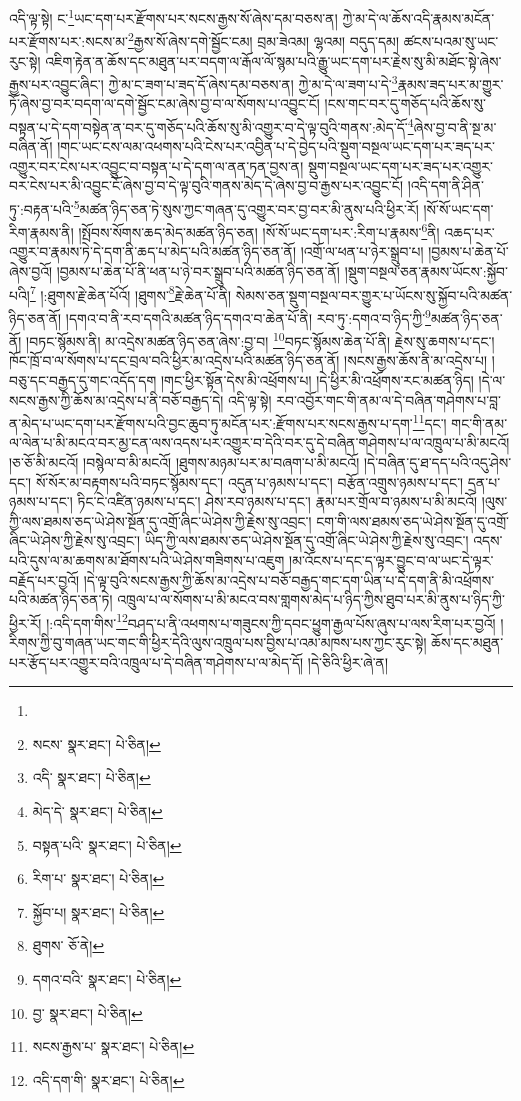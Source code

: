 འདི་ལྟ་སྟེ། ང་\footnote{}ཡང་དག་པར་རྫོགས་པར་སངས་རྒྱས་སོ་ཞེས་དམ་བཅས་ན། ཀྱེ་མ་དེ་ལ་ཆོས་འདི་རྣམས་མངོན་པར་རྫོགས་པར་:སངས་མ་\footnote{སངས་  སྣར་ཐང་།  པེ་ཅིན། }རྒྱས་སོ་ཞེས་དགེ་སྦྱོང་ངམ། བྲམ་ཟེའམ། ལྷའམ། བདུད་དམ། ཚངས་པའམ་སུ་ཡང་རུང་སྟེ། འཇིག་རྟེན་ན་ཆོས་དང་མཐུན་པར་བདག་ལ་རྒོལ་ལོ་སྙམ་པའི་རྒྱུ་ཡང་དག་པར་རྗེས་སུ་མི་མཐོང་སྟེ་ཞེས་རྒྱས་པར་འབྱུང་ཞིང་། ཀྱེ་མ་ང་ཟག་པ་ཟད་དོ་ཞེས་དམ་བཅས་ན། ཀྱེ་མ་དེ་ལ་ཟག་པ་དེ་\footnote{འདི་  སྣར་ཐང་།  པེ་ཅིན། }རྣམས་ཟད་པར་མ་གྱུར་ཏོ་ཞེས་བྱ་བར་བདག་ལ་དགེ་སྦྱོང་ངམ་ཞེས་བྱ་བ་ལ་སོགས་པ་འབྱུང་ངོ། །ངས་གང་བར་དུ་གཅོད་པའི་ཆོས་སུ་བསྟན་པ་དེ་དག་བསྟེན་ན་བར་དུ་གཅོད་པའི་ཆོས་སུ་མི་འགྱུར་བ་དེ་ལྟ་བུའི་གནས་:མེད་དོ་\footnote{མེད་དེ་  སྣར་ཐང་།  པེ་ཅིན། }ཞེས་བྱ་བ་ནི་སྔ་མ་བཞིན་ནོ། །གང་ཡང་ངས་ལམ་འཕགས་པའི་ངེས་པར་འབྱིན་པ་དེ་བྱེད་པའི་སྡུག་བསྔལ་ཡང་དག་པར་ཟད་པར་འགྱུར་བར་ངེས་པར་འབྱུང་བ་བསྟན་པ་དེ་དག་ལ་ནན་ཏན་བྱས་ན། སྡུག་བསྔལ་ཡང་དག་པར་ཟད་པར་འགྱུར་བར་ངེས་པར་མི་འབྱུང་ངོ་ཞེས་བྱ་བ་དེ་ལྟ་བུའི་གནས་མེད་དེ་ཞེས་བྱ་བ་རྒྱས་པར་འབྱུང་ངོ། །འདི་དག་ནི་ཤིན་ཏུ་:བརྟན་པའི་\footnote{བསྟན་པའི་  སྣར་ཐང་།  པེ་ཅིན། }མཚན་ཉིད་ཅན་ཏེ་སུས་ཀྱང་གཞན་དུ་འགྱུར་བར་བྱ་བར་མི་ནུས་པའི་ཕྱིར་རོ། །སོ་སོ་ཡང་དག་རིག་རྣམས་ནི། །སྤོབས་སོགས་ཆད་མེད་མཚན་ཉིད་ཅན། །སོ་སོ་ཡང་དག་པར་:རིག་པ་རྣམས་\footnote{རིག་པ་  སྣར་ཐང་།  པེ་ཅིན། }ནི། འཆད་པར་འགྱུར་བ་རྣམས་ཏེ་དེ་དག་ནི་ཆད་པ་མེད་པའི་མཚན་ཉིད་ཅན་ནོ། །འགྲོ་ལ་ཕན་པ་ཉེར་སྒྲུབ་པ། །བྱམས་པ་ཆེན་པོ་ཞེས་བྱའོ། །བྱམས་པ་ཆེན་པོ་ནི་ཕན་པ་ཉེ་བར་སྒྲུབ་པའི་མཚན་ཉིད་ཅན་ནོ། །སྡུག་བསྔལ་ཅན་རྣམས་ཡོངས་:སྐྱོབ་པའི།\footnote{སྐྱོབ་པ།  སྣར་ཐང་།  པེ་ཅིན། } །:ཐུགས་རྗེ་ཆེན་པོའོ། །ཐུགས་\footnote{ཐུགས་  ཅོ་ནེ། }རྗེ་ཆེན་པོ་ནི། སེམས་ཅན་སྡུག་བསྔལ་བར་གྱུར་པ་ཡོངས་སུ་སྐྱོབ་པའི་མཚན་ཉིད་ཅན་ནོ། །དགའ་བ་ནི་རབ་དགའི་མཚན་ཉིད་དགའ་བ་ཆེན་པོ་ནི། རབ་ཏུ་:དགའ་བ་ཉིད་ཀྱི་\footnote{དགའ་བའི་  སྣར་ཐང་།  པེ་ཅིན། }མཚན་ཉིད་ཅན་ནོ། །བཏང་སྙོམས་ནི། མ་འདྲེས་མཚན་ཉིད་ཅན་ཞེས་:བྱ་བ། \footnote{བྱ་  སྣར་ཐང་།  པེ་ཅིན། }བཏང་སྙོམས་ཆེན་པོ་ནི། རྗེས་སུ་ཆགས་པ་དང་། ཁོང་ཁྲོ་བ་ལ་སོགས་པ་དང་བྲལ་བའི་ཕྱིར་མ་འདྲེས་པའི་མཚན་ཉིད་ཅན་ནོ། །སངས་རྒྱས་ཆོས་ནི་མ་འདྲེས་པ། །བཅུ་དང་བརྒྱད་དུ་གང་འདོད་དག །གང་ཕྱིར་སྟོན་དེས་མི་འཕྲོགས་པ། །དེ་ཕྱིར་མི་འཕྲོགས་རང་མཚན་ཉིད། །དེ་ལ་སངས་རྒྱས་ཀྱི་ཆོས་མ་འདྲེས་པ་ནི་བཅོ་བརྒྱད་དེ། འདི་ལྟ་སྟེ། རབ་འབྱོར་གང་གི་ནམ་ལ་དེ་བཞིན་གཤེགས་པ་བླ་ན་མེད་པ་ཡང་དག་པར་རྫོགས་པའི་བྱང་ཆུབ་ཏུ་མངོན་པར་:རྫོགས་པར་སངས་རྒྱས་པ་དག་\footnote{སངས་རྒྱས་པ་  སྣར་ཐང་།  པེ་ཅིན། }དང་། གང་གི་ནམ་ལ་ལེན་པ་མི་མངའ་བར་མྱ་ངན་ལས་འདས་པར་འགྱུར་བ་དེའི་བར་དུ་དེ་བཞིན་གཤེགས་པ་ལ་འཁྲུལ་པ་མི་མངའོ། །ཅ་ཅོ་མི་མངའོ། །བསྙེལ་བ་མི་མངའོ། །ཐུགས་མཉམ་པར་མ་བཞག་པ་མི་མངའོ། །དེ་བཞིན་དུ་ཐ་དད་པའི་འདུ་ཤེས་དང་། སོ་སོར་མ་བརྟགས་པའི་བཏང་སྙོམས་དང་། འདུན་པ་ཉམས་པ་དང་། བརྩོན་འགྲུས་ཉམས་པ་དང་། དྲན་པ་ཉམས་པ་དང་། ཏིང་ངེ་འཛིན་ཉམས་པ་དང་། ཤེས་རབ་ཉམས་པ་དང་། རྣམ་པར་གྲོལ་བ་ཉམས་པ་མི་མངའོ། །ལུས་ཀྱི་ལས་ཐམས་ཅད་ཡེ་ཤེས་སྔོན་དུ་འགྲོ་ཞིང་ཡེ་ཤེས་ཀྱི་རྗེས་སུ་འབྲང་། ངག་གི་ལས་ཐམས་ཅད་ཡེ་ཤེས་སྔོན་དུ་འགྲོ་ཞིང་ཡེ་ཤེས་ཀྱི་རྗེས་སུ་འབྲང་། ཡིད་ཀྱི་ལས་ཐམས་ཅད་ཡེ་ཤེས་སྔོན་དུ་འགྲོ་ཞིང་ཡེ་ཤེས་ཀྱི་རྗེས་སུ་འབྲང་། འདས་པའི་དུས་ལ་མ་ཆགས་མ་ཐོགས་པའི་ཡེ་ཤེས་གཟིགས་པ་འཇུག །མ་འོངས་པ་དང་ད་ལྟར་བྱུང་བ་ལ་ཡང་དེ་ལྟར་བརྗོད་པར་བྱའོ། །དེ་ལྟ་བུའི་སངས་རྒྱས་ཀྱི་ཆོས་མ་འདྲེས་པ་བཅོ་བརྒྱད་གང་དག་ཡིན་པ་དེ་དག་ནི་མི་འཕྲོགས་པའི་མཚན་ཉིད་ཅན་ཏེ། འཁྲུལ་པ་ལ་སོགས་པ་མི་མངའ་བས་གླགས་མེད་པ་ཉིད་ཀྱིས་ཐུབ་པར་མི་ནུས་པ་ཉིད་ཀྱི་ཕྱིར་རོ། །:འདི་དག་གིས་\footnote{འདི་དག་གི་  སྣར་ཐང་།  པེ་ཅིན། }བཤད་པ་ནི་འཕགས་པ་གཟུངས་ཀྱི་དབང་ཕྱུག་རྒྱལ་པོས་ཞུས་པ་ལས་རིག་པར་བྱའོ། །རིགས་ཀྱི་བུ་གཞན་ཡང་གང་གི་ཕྱིར་དེའི་ལུས་འཁྲུལ་པས་བྱིས་པ་འམ་མཁས་པས་ཀྱང་རུང་སྟེ། ཆོས་དང་མཐུན་པར་རྩོད་པར་འགྱུར་བའི་འཁྲུལ་པ་དེ་བཞིན་གཤེགས་པ་ལ་མེད་དོ། །དེ་ཅིའི་ཕྱིར་ཞེ་ན། 